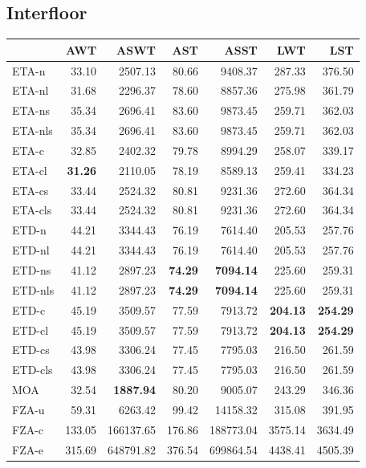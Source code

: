 \documentclass{UoYCSproject}
\begin{document}
\subsection{Interfloor}

\begin{tabular}{l | r r r r r r}
	& AWT & ASWT & AST & ASST & LWT & LST \\
	\hline
	ETA-n & 33.10 & 2507.13 & 80.66 & 9408.37 & 287.33 & 376.50 \\
	ETA-nl & 31.68 & 2296.37 & 78.60 & 8857.36 & 275.98 & 361.79 \\
	ETA-ns & 35.34 & 2696.41 & 83.60 & 9873.45 & 259.71 & 362.03 \\
	ETA-nls & 35.34 & 2696.41 & 83.60 & 9873.45 & 259.71 & 362.03 \\
	ETA-c & 32.85 & 2402.32 & 79.78 & 8994.29 & 258.07 & 339.17 \\
	ETA-cl & \textbf{31.26} & 2110.05 & 78.19 & 8589.13 & 259.41 & 334.23 \\
	ETA-cs & 33.44 & 2524.32 & 80.81 & 9231.36 & 272.60 & 364.34 \\
	ETA-cls & 33.44 & 2524.32 & 80.81 & 9231.36 & 272.60 & 364.34 \\
	\hline
	ETD-n & 44.21 & 3344.43 & 76.19 & 7614.40 & 205.53 & 257.76 \\
	ETD-nl & 44.21 & 3344.43 & 76.19 & 7614.40 & 205.53 & 257.76 \\
	ETD-ns & 41.12 & 2897.23 & \textbf{74.29} & \textbf{7094.14} & 225.60 & 259.31 \\
	ETD-nls & 41.12 & 2897.23 & \textbf{74.29} & \textbf{7094.14} & 225.60 & 259.31 \\
	ETD-c & 45.19 & 3509.57 & 77.59 & 7913.72 & \textbf{204.13} & \textbf{254.29} \\
	ETD-cl & 45.19 & 3509.57 & 77.59 & 7913.72 & \textbf{204.13} & \textbf{254.29} \\
	ETD-cs & 43.98 & 3306.24 & 77.45 & 7795.03 & 216.50 & 261.59 \\
	ETD-cls & 43.98 & 3306.24 & 77.45 & 7795.03 & 216.50 & 261.59 \\
	\hline
	MOA & 32.54 & \textbf{1887.94} & 80.20 & 9005.07 & 243.29 & 346.36 \\
	\hline
	FZA-u & 59.31 & 6263.42 & 99.42 & 14158.32 & 315.08 & 391.95 \\
	FZA-c & 133.05 & 166137.65 & 176.86 & 188773.04 & 3575.14 & 3634.49 \\
	FZA-e & 315.69 & 648791.82 & 376.54 & 699864.54 & 4438.41 & 4505.39
\end{tabular}
\end{document}
